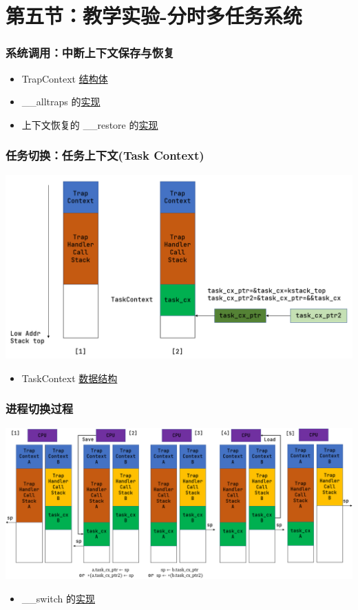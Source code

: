 \section{第五节：教学实验-分时多任务系统}%
\begin{frame}
	\frametitle{系统调用：中断上下文保存与恢复}
    \begin{itemize}
  		\item  TrapContext \href{https://github.com/rcore-os/rCore-Tutorial-v3/blob/ch3-coop/os/src/trap/context.rs\#L4}{结构体}
		\item  \_\_alltraps 的\href{https://github.com/rcore-os/rCore-Tutorial-v3/blob/ch3-coop/os/src/trap/trap.S\#L12}{实现}
		\item 上下文恢复的 \_\_restore 的\href{https://github.com/rcore-os/rCore-Tutorial-v3/blob/ch3-coop/os/src/trap/trap.S\#L40}{实现}
    \end{itemize}	
\end{frame}
\begin{frame}
	\frametitle{任务切换：任务上下文(Task Context)}
	\includegraphics[width=0.7\linewidth]{figs/task_context.png}
	\begin{itemize}
	\item TaskContext \href{https://github.com/rcore-os/rCore-Tutorial-v3/blob/ch3-coop/os/src/task/context.rs\#L2}{数据结构}
	\end{itemize}
\end{frame}
\begin{frame}
	\frametitle{进程切换过程}
% 
\includegraphics[width=0.9\linewidth]{figs/switch.png}
% 
	\begin{itemize}
		\item \_\_switch 的\href{https://github.com/rcore-os/rCore-Tutorial-v3/blob/ch3-coop/os/src/task/switch.S\#L10}{实现}
	\end{itemize}

\end{frame}

